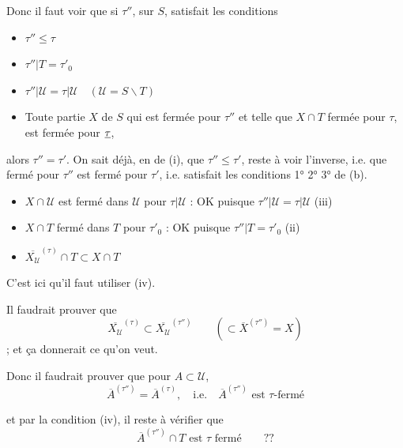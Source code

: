 \documentclass[11pt,a4paper]{article}
\begin{document}
Donc il faut voir que si $\tau''$, sur $S$, satisfait les conditions
\begin{itemize}
  \item[(i)] $\tau'' \leq \tau$
  \item[(ii)] $\tau''|T = \tau'_0$
  \item[(iii)] $\tau''|\mathcal{U} = \tau|\mathcal{U} \quad (\mathcal{U} = S \smallsetminus T)$
  \item[(iv)] Toute partie  $X$ de $S$  qui est fermée pour $\tau''$ et telle que $X \cap T$ fermée pour $\tau$, est fermée pour $\uncertain{\tau}$,
\end{itemize}
alors $\tau'' = \tau'$. On sait déjà, en  de (i), que $\tau'' \leq \tau'$, reste à voir l'inverse, i.e. que   fermé pour $\tau''$ est fermé pour $\tau'$, i.e. satisfait les conditions 1° 2° 3° de (b).
\begin{itemize}
  \item[1°)] $X \cap \mathcal{U}$ est fermé dans $\mathcal{U}$ pour $\tau|\mathcal{U}$ : OK puisque $\tau''|\mathcal{U} = \tau|\mathcal{U}$ (iii)
  \item[2°)] $X \cap T$ fermé dans $T$ pour $\tau'_0$ : OK puisque $\tau''|T = \tau'_0$ (ii)
  \item[3°)] $\overline{X_{\mathcal{U}}}^{(\tau)} \cap T \subset X \cap T$
\end{itemize}

C'est ici  qu'il faut utiliser (iv).

Il faudrait prouver que
\[
  \overline{X_{\mathcal{U}}}^{(\tau)} \subset \overline{X_{\mathcal{U}}}^{(\tau'')} \qquad \left(\subset \overline{X}^{(\tau'')} = X\right)
\]
 ; et ça donnerait ce qu'on veut.

Donc il faudrait prouver que pour $A \subset \mathcal{U}$,
\[
  \overline{A}^{(\tau'')} = \overline{A}^{(\tau)} , \quad \text{i.e.} \quad \overline{A}^{(\tau'')} \text{ est } \tau\text{-fermé}
\]

et par la condition (iv), il reste à vérifier que
\[
  \overline{A}^{(\tau'')} \cap T \text{ est } \tau \text{ fermé} \qquad ??
\]
\end{document}
